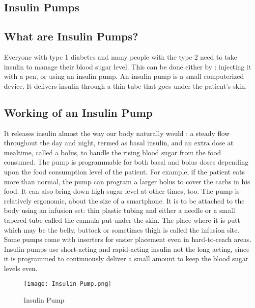 \documentclass[12pt]{article}
\begin{document}
\begin{normalsize}
\centering
\section{Insulin Pumps}
\raggedright
\subsection{What are Insulin Pumps?}
Everyone with type 1 diabetes and many people with the type 2 need to take insulin to manage their blood sugar level. This can be done either by : injecting it with a pen, or using an insulin pump.
\linebreak
\linebreak
An insulin pump is a small computerized device. It delivers insulin through a thin tube that goes under the patient's skin.
\subsection{Working of an Insulin Pump}
It releases insulin almost the way our body naturally would : a steady flow throughout the day and night, termed as basal insulin, and an extra dose at mealtime, called a bolus, to handle the rising blood sugar from the food consumed. The pump is programmable for both basal and bolus doses depending upon the food consumption level of the patient. For example, if the patient eats more than normal, the pump can program a larger bolus to cover the carbs in his food. It can also bring down high sugar level at other times, too.\linebreak
\linebreak
The pump is relatively ergonomic, about the size of a smartphone. It is to be attached to the body using an infusion set: thin plastic tubing and either a needle or a small tapered tube called the cannula put under the skin. The place where it is putt which may be the belly, buttock or sometimes thigh is called the infusion site. Some pumps come with inserters for easier placement even in hard-to-reach areas. Insulin pumps use short-acting and rapid-acting insulin not the long acting, since it is programmed to continuously deliver a small amount to keep the blood sugar levels even.
\begin{figure}[h]
\centering
\texttt{[image: Insulin Pump.png]}
\caption{Insulin Pump}
\end{figure}

\end{normalsize}
\end{document}
